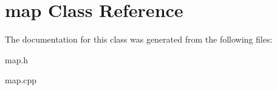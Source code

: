 \hypertarget{classmap}{}\section{map Class Reference}
\label{classmap}


The documentation for this class was generated from the following files\+:\begin{DoxyCompactItemize}
\item 
map.\+h\item 
map.\+cpp\end{DoxyCompactItemize}
